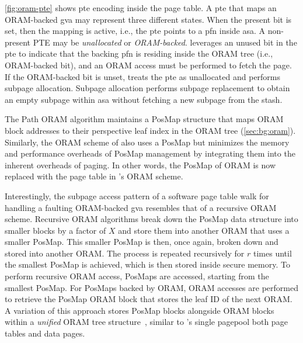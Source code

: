 \autoref{fig:oram-pte} shows \thename \gls{pte} encoding inside the page table.
A \gls{pte} that maps an ORAM-backed \gls{gva} may represent three different states.
When the present bit is set, then the mapping is active, i.e., the \gls{pte} points to a \gls{pfn} inside \gls{asa}.
A non-present PTE may be \emph{unallocated} or \emph{ORAM-backed}.
\thename leverages an unused bit in the \gls{pte} to indicate that the backing \gls{pfn} is residing inside the ORAM tree (i.e., ORAM-backed bit), and an ORAM access must be performed to fetch the page.
If the ORAM-backed bit is unset, \thename treats the \gls{pte} as unallocated and performs subpage allocation.
Subpage allocation performs subpage replacement to obtain an empty subpage within \gls{asa} without fetching a new subpage from the stash.

The Path ORAM algorithm maintains a PosMap structure that maps ORAM block addresses to their perspective leaf index in the ORAM tree (\cref{sec:bg:oram}).
Similarly, the ORAM scheme of \thename also uses a PosMap but minimizes the memory and performance overheads of PosMap management by integrating them into the inherent overheads of paging.
In other words, the PosMap of ORAM is now replaced with the page table in \thename's ORAM scheme.


Interestingly, the subpage access pattern of a software page table walk for handling a faulting ORAM-backed \gls{gva} resembles that of a recursive ORAM scheme.
Recursive ORAM algorithms break down the PosMap data structure into smaller blocks by a factor of $X$ and store them into another ORAM that uses a smaller PosMap.
This smaller PosMap is then, once again, broken down and stored into another ORAM.
The process is repeated recursively for $r$ times until the smallest PosMap is achieved, which is then stored inside secure memory.
To perform recursive ORAM access, PosMaps are accessed, starting from the smallest PosMap.
For PosMaps backed by ORAM, ORAM accesses are performed to retrieve the PosMap ORAM block that stores the leaf ID of the next ORAM.
A variation of this approach stores PosMap blocks alongside ORAM blocks within a \emph{unified} ORAM tree structure~\cite{freecursiveoram}, similar to \thename's single \gls{pagepool} both page tables and data pages.

